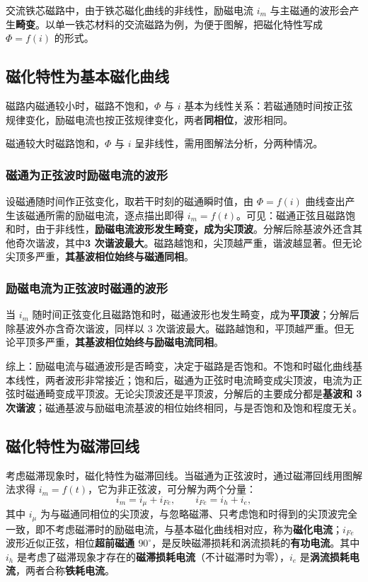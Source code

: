 交流铁芯磁路中，由于铁芯磁化曲线的非线性，励磁电流 $i_m$ 与主磁通的波形会产生\textbf{畸变}。以单一铁芯材料的交流磁路为例，为便于图解，把磁化特性写成 $\Phi=f(i)$ 的形式。

\subsection{磁化特性为基本磁化曲线}
磁路内磁通较小时，磁路不饱和，$\Phi$ 与 $i$ 基本为线性关系：若磁通随时间按正弦规律变化，励磁电流也按正弦规律变化，两者\textbf{同相位}，波形相同。

磁通较大时磁路饱和，$\Phi$ 与 $i$ 呈非线性，需用图解法分析，分两种情况。

\subsubsection{磁通为正弦波时励磁电流的波形}
设磁通随时间作正弦变化，取若干时刻的磁通瞬时值，由 $\Phi=f(i)$ 曲线查出产生该磁通所需的励磁电流，逐点描出即得 $i_m=f(t)$。可见：磁通正弦且磁路饱和时，由于非线性，\textbf{励磁电流波形发生畸变，成为尖顶波}。分解后除基波外还含其他奇次谐波，其中\textbf{3 次谐波最大}。磁路越饱和，尖顶越严重，谐波越显著。但无论尖顶多严重，\textbf{其基波相位始终与磁通同相}。

\subsubsection{励磁电流为正弦波时磁通的波形}
当 $i_m$ 随时间正弦变化且磁路饱和时，磁通波形也发生畸变，成为\textbf{平顶波}；分解后除基波外亦含奇次谐波，同样以 3 次谐波最大。磁路越饱和，平顶越严重。但无论平顶多严重，\textbf{其基波相位始终与励磁电流同相}。

综上：励磁电流与磁通波形是否畸变，决定于磁路是否饱和。不饱和时磁化曲线基本线性，两者波形非常接近；饱和后，磁通为正弦时电流畸变成尖顶波，电流为正弦时磁通畸变成平顶波。无论尖顶波还是平顶波，分解后的主要成分都是\textbf{基波和 3 次谐波}；磁通基波与励磁电流基波的相位始终相同，与是否饱和及饱和程度无关。

\subsection{磁化特性为磁滞回线}
考虑磁滞现象时，磁化特性为磁滞回线。当磁通为正弦波时，通过磁滞回线用图解法求得 $i_m=f(t)$，它为非正弦波，可分解为两个分量：
\begin{equation}
i_m=i_\mu+i_{Fe},\qquad i_{Fe}=i_h+i_e ,
\end{equation}
其中 $i_\mu$ 为与磁通同相位的尖顶波，与忽略磁滞、只考虑饱和时得到的尖顶波完全一致，即不考虑磁滞时的励磁电流，与基本磁化曲线相对应，称为\textbf{磁化电流}；$i_{Fe}$ 波形近似正弦，相位\textbf{超前磁通 $90^\circ$}，是反映磁滞损耗和涡流损耗的\textbf{有功电流}。其中 $i_h$ 是考虑了磁滞现象才存在的\textbf{磁滞损耗电流}（不计磁滞时为零），$i_e$ 是\textbf{涡流损耗电流}，两者合称\textbf{铁耗电流}。

